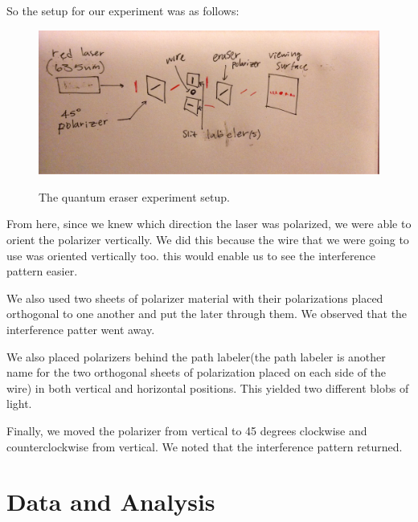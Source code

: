 \documentclass[12pt letterpaper]{article}
\begin{document}
So the setup for our experiment was as follows:
\begin{figure}[!ht]
  \caption{The quantum eraser experiment setup.}
  \centering
    \includegraphics[width=.75\textwidth]{quantum_eraser_setup.jpg}
    \label{fig:setup}
\end{figure}

From here, since we knew which direction the laser was polarized, we were able to orient the polarizer vertically. We did this because the wire that we were going to use was oriented vertically too. this would enable us to see the interference pattern easier. 

We also used two sheets of polarizer material with their polarizations placed orthogonal to one another and put the later through them. We observed that the interference patter went away. 

We also placed polarizers behind the path labeler(the path labeler is another name for the two orthogonal sheets of polarization placed on each side of the wire) in both vertical and horizontal positions. This yielded two different blobs of light. 

Finally, we moved the polarizer from vertical to 45 degrees clockwise and counterclockwise from vertical. We noted that the interference pattern returned.  
  

 





\section*{Data and Analysis}
\end{document}
